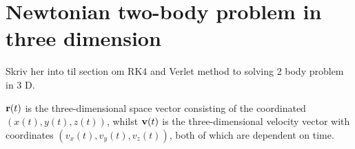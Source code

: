 \section{Newtonian two-body problem in three dimension}
\label{Newton2body3D}
Skriv her into til section om RK4 and Verlet method to solving 2 body problem in 3 D.

$\mbox{\textbf{r}}(t)$ is the three-dimensional space vector consisting of the coordinated $(x(t),y(t),z(t))$, whilst $\mbox{\textbf{v}}(t)$ is the three-dimensional velocity vector with coordinates $(v_x(t),v_y(t),v_z(t))$, both of which are dependent on time. 
